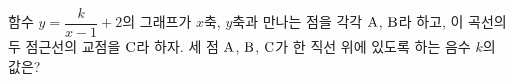 함수 $y=\dfrac{k}{x-1}+2$의 그래프가 $x$축, $y$축과 만나는 점을 각각 $\mathrm{A}$, $\mathrm{B}$라 하고, 이 곡선의 두 점근선의 교점을 $\mathrm{C}$라 하자. 세 점 $\mathrm{A}$, $\mathrm{B}$, $\mathrm{C}$가 한 직선 위에 있도록 하는 음수 $k$의 값은?

